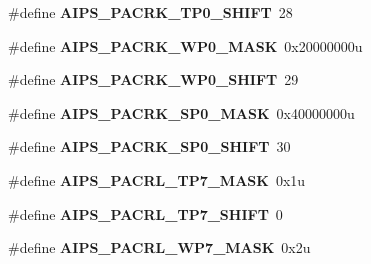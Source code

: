 \begin{DoxyCompactItemize}
\item 
\#define {\bfseries A\+I\+P\+S\+\_\+\+P\+A\+C\+R\+K\+\_\+\+T\+P0\+\_\+\+S\+H\+I\+FT}~28\hypertarget{group__AIPS__Register__Masks_gaf611117bf345f20ab9439c99a65bcafa}{}\label{group__AIPS__Register__Masks_gaf611117bf345f20ab9439c99a65bcafa}

\item 
\#define {\bfseries A\+I\+P\+S\+\_\+\+P\+A\+C\+R\+K\+\_\+\+W\+P0\+\_\+\+M\+A\+SK}~0x20000000u\hypertarget{group__AIPS__Register__Masks_ga4bfd4d9c76c24186ed8132d1519e4a67}{}\label{group__AIPS__Register__Masks_ga4bfd4d9c76c24186ed8132d1519e4a67}

\item 
\#define {\bfseries A\+I\+P\+S\+\_\+\+P\+A\+C\+R\+K\+\_\+\+W\+P0\+\_\+\+S\+H\+I\+FT}~29\hypertarget{group__AIPS__Register__Masks_ga8e1697040b37aa4bb80f29a12b3d4c8e}{}\label{group__AIPS__Register__Masks_ga8e1697040b37aa4bb80f29a12b3d4c8e}

\item 
\#define {\bfseries A\+I\+P\+S\+\_\+\+P\+A\+C\+R\+K\+\_\+\+S\+P0\+\_\+\+M\+A\+SK}~0x40000000u\hypertarget{group__AIPS__Register__Masks_ga25e1f66e3bdfb5f67acc221d1e9d8ebb}{}\label{group__AIPS__Register__Masks_ga25e1f66e3bdfb5f67acc221d1e9d8ebb}

\item 
\#define {\bfseries A\+I\+P\+S\+\_\+\+P\+A\+C\+R\+K\+\_\+\+S\+P0\+\_\+\+S\+H\+I\+FT}~30\hypertarget{group__AIPS__Register__Masks_gae656b1ce173fb026b6a4318795612c2c}{}\label{group__AIPS__Register__Masks_gae656b1ce173fb026b6a4318795612c2c}

\item 
\#define {\bfseries A\+I\+P\+S\+\_\+\+P\+A\+C\+R\+L\+\_\+\+T\+P7\+\_\+\+M\+A\+SK}~0x1u\hypertarget{group__AIPS__Register__Masks_gaad8600c1f3d8c788e50c3156d1000917}{}\label{group__AIPS__Register__Masks_gaad8600c1f3d8c788e50c3156d1000917}

\item 
\#define {\bfseries A\+I\+P\+S\+\_\+\+P\+A\+C\+R\+L\+\_\+\+T\+P7\+\_\+\+S\+H\+I\+FT}~0\hypertarget{group__AIPS__Register__Masks_ga800d08dab0f51ed296a0b0735e2e4d66}{}\label{group__AIPS__Register__Masks_ga800d08dab0f51ed296a0b0735e2e4d66}

\item 
\#define {\bfseries A\+I\+P\+S\+\_\+\+P\+A\+C\+R\+L\+\_\+\+W\+P7\+\_\+\+M\+A\+SK}~0x2u\hypertarget{group__AIPS__Register__Masks_gabe1bc072057ede25a7903dace778da5a}{}\label{group__AIPS__Register__Masks_gabe1bc072057ede25a7903dace778da5a}


\end{DoxyCompactItemize}
